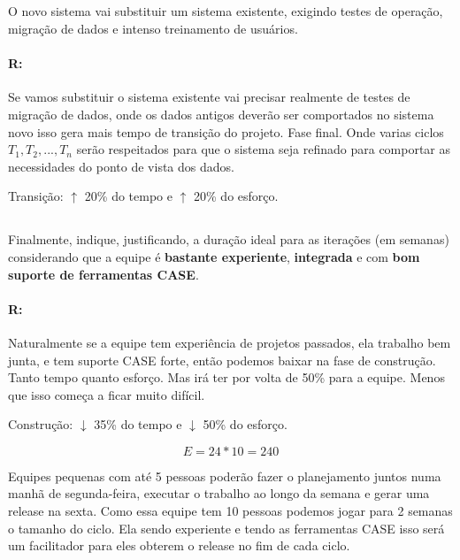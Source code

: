 \documentclass[10pt, a4paper]{report}
\begin{document}
\subsection{}
\qquad O novo sistema vai substituir um sistema existente, exigindo testes de
operação, migração de dados e intenso treinamento de usuários.

\paragraph{R:}
Se vamos substituir o sistema existente vai precisar realmente de testes de
migração de dados, onde os dados antigos deverão ser comportados no sistema novo
isso gera mais tempo de transição do projeto. Fase final. Onde varias ciclos
$T_1, T_2, ..., T_n$ serão respeitados para que o sistema seja refinado para
comportar as necessidades do ponto de vista dos dados.

\begin{center}
  \begin{Large}
    Transição: $\uparrow$ 20\% do tempo e $\uparrow$ 20\% do esforço.
  \end{Large}
\end{center}

\subsection{}
\qquad Finalmente, indique, justificando, a duração ideal para as iterações (em
semanas) considerando que a equipe é \textbf{bastante experiente},
\textbf{integrada} e com \textbf{bom suporte de ferramentas CASE}.

\paragraph{R:} Naturalmente se a equipe tem experiência de projetos passados,
ela trabalho bem junta, e tem suporte CASE forte, então podemos baixar na fase
de construção. Tanto tempo quanto esforço. Mas irá ter por volta de 50\% para a
equipe. Menos que isso começa a ficar muito difícil.

\begin{center}
  \begin{Large}
    Construção: $\downarrow$ 35\% do tempo e $\downarrow$ 50\% do esforço.
  \end{Large}
\end{center}

$$E = 24 * 10 = 240$$

Equipes pequenas com até 5 pessoas poderão fazer o planejamento juntos numa
manhã de segunda-feira, executar o trabalho ao longo da semana e gerar uma
release na sexta. Como essa equipe tem 10 pessoas podemos jogar para 2 semanas o
tamanho do ciclo. Ela sendo experiente e tendo as ferramentas CASE isso será um
facilitador para eles obterem o release no fim de cada ciclo.
\end{document}
